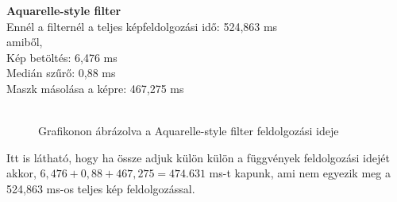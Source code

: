 \newpage
\textbf{Aquarelle-style filter}\\
Ennél a filternél a teljes képfeldolgozási idő: 524,863 ms\\
amiből,\\
Kép betöltés: 6,476 ms\\
Medián szűrő: 0,88 ms\\
Maszk másolása a képre: 467,275 ms\\\\
\begin{figure}[ht]
\centering
{}
\caption{Grafikonon ábrázolva a Aquarelle-style filter feldolgozási ideje} 
\label{fig: graf4}
\end{figure}
\noindent Itt is látható, hogy ha össze adjuk külön külön a függvények feldolgozási idejét akkor, $6,476+0,88+467,275=474.631$ ms-t kapunk, ami nem egyezik meg a 524,863 ms-os teljes kép feldolgozással.




